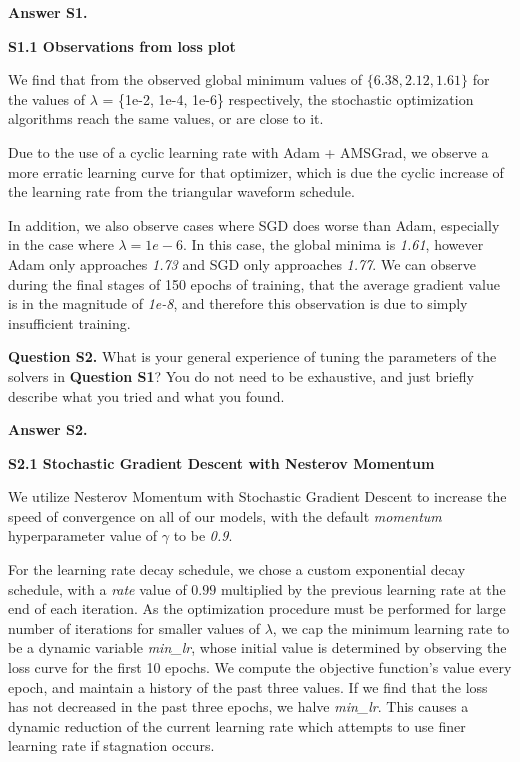 \documentclass[11pt]{report}
\begin{document}
{\bf Answer S1.}
%

{\bf S1.1 Observations from loss plot}

We find that from the observed global minimum values of $\{6.38, 2.12, 1.61\}$ for the values of $\lambda$ = \{1e{-2}, 1e{-4}, 1e{-6}\} respectively, the stochastic optimization algorithms reach the same values, or are close to it.

Due to the use of a cyclic learning rate with Adam + AMSGrad, we observe a more erratic learning curve for that optimizer, which is due the cyclic increase of the learning rate from the triangular waveform schedule. 

In addition, we also observe cases where SGD does worse than Adam, especially in the case where $\lambda = 1e-6$. In this case, the global minima is \textit{1.61}, however Adam only approaches \textit{1.73} and SGD only approaches \textit{1.77}. We can observe during the final stages of 150 epochs of training, that the average gradient value is in the magnitude of \textit{1e-8}, and therefore this observation is due to simply insufficient training.

{\bf Question S2.}
What is your general experience of tuning the parameters of the solvers in {\bf Question S1}?
You do not need to be exhaustive, and just briefly describe what you tried and what you found.

{\bf Answer S2.}
%

{\bf S2.1 Stochastic Gradient Descent with Nesterov Momentum}

We utilize Nesterov Momentum with Stochastic Gradient Descent to increase the speed of convergence on all of our models, with the default \textit{momentum} hyperparameter value of $\gamma$ to be \textit{0.9}. 

For the learning rate decay schedule, we chose a custom exponential decay schedule, with a \textit{rate} value of $0.99$ multiplied by the previous learning rate at the end of each iteration. As the optimization procedure must be performed for large number of iterations for smaller values of $\lambda$, we cap the minimum learning rate to be a dynamic variable \textit{min\_lr}, whose initial value is determined by observing the loss curve for the first 10 epochs. We compute the objective function's value every epoch, and maintain a history of the past three values. If we find that the loss has not decreased in the past three epochs, we halve \textit{min\_lr}. This causes a dynamic reduction of the current learning rate which attempts to use finer learning rate if stagnation occurs. 
\end{document}
